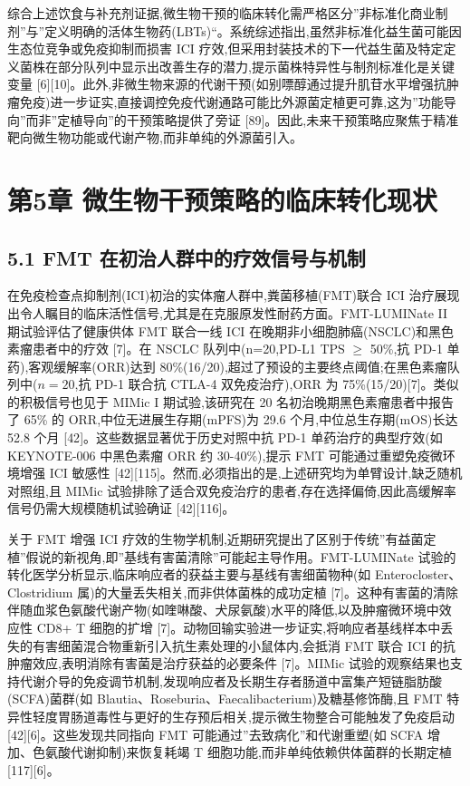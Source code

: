 综合上述饮食与补充剂证据,微生物干预的临床转化需严格区分''非标准化商业制剂''与''定义明确的活体生物药(LBTs)``。系统综述指出,虽然非标准化益生菌可能因生态位竞争或免疫抑制而损害 ICI 疗效,但采用封装技术的下一代益生菌及特定定义菌株在部分队列中显示出改善生存的潜力,提示菌株特异性与制剂标准化是关键变量 {[}6{]}{[}10{]}。此外,非微生物来源的代谢干预(如别嘌醇通过提升肌苷水平增强抗肿瘤免疫)进一步证实,直接调控免疫代谢通路可能比外源菌定植更可靠,这为''功能导向''而非''定植导向''的干预策略提供了旁证 {[}89{]}。因此,未来干预策略应聚焦于精准靶向微生物功能或代谢产物,而非单纯的外源菌引入。

\section{第5章 微生物干预策略的临床转化现状}\label{ux7b2c5ux7ae0-ux5faeux751fux7269ux5e72ux9884ux7b56ux7565ux7684ux4e34ux5e8aux8f6cux5316ux73b0ux72b6}

\subsection{5.1 FMT 在初治人群中的疗效信号与机制}\label{fmt-ux5728ux521dux6cbbux4ebaux7fa4ux4e2dux7684ux7597ux6548ux4fe1ux53f7ux4e0eux673aux5236}

在免疫检查点抑制剂(ICI)初治的实体瘤人群中,粪菌移植(FMT)联合 ICI 治疗展现出令人瞩目的临床活性信号,尤其是在克服原发性耐药方面。FMT-LUMINate II 期试验评估了健康供体 FMT 联合一线 ICI 在晚期非小细胞肺癌(NSCLC)和黑色素瘤患者中的疗效 {[}7{]}。在 NSCLC 队列中(n=20,PD-L1 TPS \(\geq\) 50\%,抗 PD-1 单药),客观缓解率(ORR)达到 80\%(16/20),超过了预设的主要终点阈值;在黑色素瘤队列中(\(n=20\),抗 PD-1 联合抗 CTLA-4 双免疫治疗),ORR 为 75\%(15/20){[}7{]}。类似的积极信号也见于 MIMic I 期试验,该研究在 20 名初治晚期黑色素瘤患者中报告了 65\% 的 ORR,中位无进展生存期(mPFS)为 29.6 个月,中位总生存期(mOS)长达 52.8 个月 {[}42{]}。这些数据显著优于历史对照中抗 PD-1 单药治疗的典型疗效(如 KEYNOTE-006 中黑色素瘤 ORR 约 30-40\%),提示 FMT 可能通过重塑免疫微环境增强 ICI 敏感性 {[}42{]}{[}115{]}。然而,必须指出的是,上述研究均为单臂设计,缺乏随机对照组,且 MIMic 试验排除了适合双免疫治疗的患者,存在选择偏倚,因此高缓解率信号仍需大规模随机试验确证 {[}42{]}{[}116{]}。

关于 FMT 增强 ICI 疗效的生物学机制,近期研究提出了区别于传统''有益菌定植''假说的新视角,即''基线有害菌清除''可能起主导作用。FMT-LUMINate 试验的转化医学分析显示,临床响应者的获益主要与基线有害细菌物种(如 Enterocloster、Clostridium 属)的大量丢失相关,而非供体菌株的成功定植 {[}7{]}。这种有害菌的清除伴随血浆色氨酸代谢产物(如喹啉酸、犬尿氨酸)水平的降低,以及肿瘤微环境中效应性 CD8+ T 细胞的扩增 {[}7{]}。动物回输实验进一步证实,将响应者基线样本中丢失的有害细菌混合物重新引入抗生素处理的小鼠体内,会抵消 FMT 联合 ICI 的抗肿瘤效应,表明消除有害菌是治疗获益的必要条件 {[}7{]}。MIMic 试验的观察结果也支持代谢介导的免疫调节机制,发现响应者及长期生存者肠道中富集产短链脂肪酸(SCFA)菌群(如 Blautia、Roseburia、Faecalibacterium)及糖基修饰酶,且 FMT 特异性轻度胃肠道毒性与更好的生存预后相关,提示微生物整合可能触发了免疫启动 {[}42{]}{[}6{]}。这些发现共同指向 FMT 可能通过''去致病化''和代谢重塑(如 SCFA 增加、色氨酸代谢抑制)来恢复耗竭 T 细胞功能,而非单纯依赖供体菌群的长期定植 {[}117{]}{[}6{]}。

